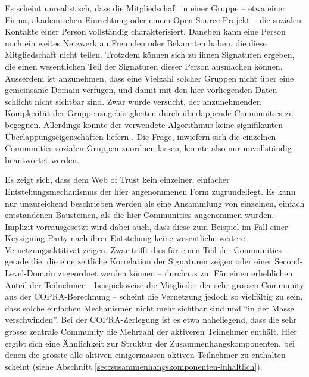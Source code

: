 Es scheint unrealistisch, dass die Mitgliedschaft in einer Gruppe --
etwa einer Firma, akademischen Einrichtung oder einem
Open-Source-Projekt -- die sozialen Kontakte einer Person
vollst\"andig charakterisiert. Daneben kann eine Person noch ein
weites Netzwerk an Freunden oder Bekannten haben, die diese
Mitgliedschaft nicht teilen. Trotzdem k\"onnen sich zu ihnen
Signaturen ergeben, die einen wesentlichen Teil der Signaturen dieser
Person ausmachen k\"onnen. Ausserdem ist anzunehmen, dass eine
Vielzahl solcher Gruppen nicht \"uber eine gemeinsame Domain
verf\"ugen, und damit mit den hier vorliegenden Daten schlicht nicht
sichtbar sind. Zwar wurde versucht, der anzunehmenden Komplexit\"at
der Gruppenzugeh\"origkeiten durch \"uberlappende Communities zu
begegnen. Allerdings konnte der verwendete Algorithmus keine
signifikanten \"Uberlappungseigenschaften liefern . Die Frage,
inwiefern sich die einzelnen Communities sozialen Gruppen zuordnen
lassen, konnte also nur unvollst\"andig beantwortet werden.

Es zeigt sich, dass dem Web of Trust kein einzelner, einfacher
Entstehungsmechanismus der hier angenommenen Form zugrundeliegt. Es
kann nur unzureichend beschrieben werden als eine Ansammlung von
einzelnen, einfach entstandenen Bausteinen, als die hier Communities
angenommen wurden. Implizit vorrausgesetzt wird dabei auch, dass diese
zum Beispiel im Fall einer Keysigning-Party nach ihrer Entstehung
keine wesentliche weitere Vernetzungsaktitiv\"at zeigen. Zwar trifft
dies f\"ur einen Teil der Communities -- gerade die, die eine
zeitliche Korrelation der Signaturen zeigen oder einer
Second-Level-Domain zugeordnet werden k\"onnen -- durchaus zu. F\"ur
einen erheblichen Anteil der Teilnehmer -- beispielsweise die
Mitglieder der sehr grossen Community aus der COPRA-Berechnung --
scheint die Vernetzung jedoch so vielf\"altig zu sein, dass solche
einfachen Mechanismen nicht mehr sichtbar sind und ``in der Masse
verschwinden''. Bei der COPRA-Zerlegung ist es etwa naheliegend, dass
die sehr grosse zentrale Community die Mehrzahl der aktiveren
Teilnehmer enth\"alt. Hier ergibt sich eine \"Ahnlichkeit zur Struktur
der Zusammenhangskomponenten, bei denen die gr\"osste alle aktiven
einigermassen aktiven Teilnehmer zu enthalten scheint (siehe Abschnitt
\ref{sec:zusammenhangskomponenten-inhaltlich}).

